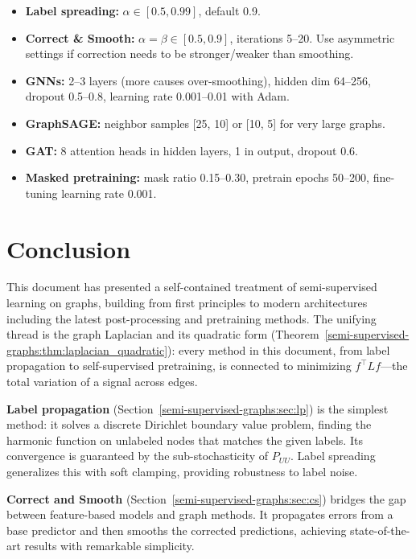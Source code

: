 \begin{notechapter}
\begin{itemize}
    \item \textbf{Label spreading:} $\alpha \in [0.5, 0.99]$, default 0.9.
    \item \textbf{Correct \& Smooth:} $\alpha = \beta \in [0.5, 0.9]$,
          iterations 5--20. Use asymmetric settings if correction needs to be
          stronger/weaker than smoothing.
    \item \textbf{GNNs:} 2--3 layers (more causes over-smoothing), hidden dim
          64--256, dropout 0.5--0.8, learning rate 0.001--0.01 with Adam.
    \item \textbf{GraphSAGE:} neighbor samples [25, 10] or [10, 5] for very
          large graphs.
    \item \textbf{GAT:} 8 attention heads in hidden layers, 1 in output,
          dropout 0.6.
    \item \textbf{Masked pretraining:} mask ratio 0.15--0.30,
          pretrain epochs 50--200, fine-tuning learning rate 0.001.
\end{itemize}

\section{Conclusion}

This document has presented a self-contained treatment of semi-supervised
learning on graphs, building from first principles to modern architectures
including the latest post-processing and pretraining methods. The unifying
thread is the graph Laplacian and its quadratic form
(Theorem~\ref{semi-supervised-graphs:thm:laplacian_quadratic}): every method in this document, from
label propagation to self-supervised pretraining, is connected to minimizing
$f^\top Lf$---the total variation of a signal across edges.

\textbf{Label propagation} (Section~\ref{semi-supervised-graphs:sec:lp}) is the simplest method: it
solves a discrete Dirichlet boundary value problem, finding the harmonic
function on unlabeled nodes that matches the given labels. Its convergence is
guaranteed by the sub-stochasticity of $P_{UU}$. Label spreading generalizes
this with soft clamping, providing robustness to label noise.

\textbf{Correct and Smooth} (Section~\ref{semi-supervised-graphs:sec:cs}) bridges the gap between
feature-based models and graph methods. It propagates errors from a base
predictor and then smooths the corrected predictions, achieving
state-of-the-art results with remarkable simplicity.


\end{notechapter}
